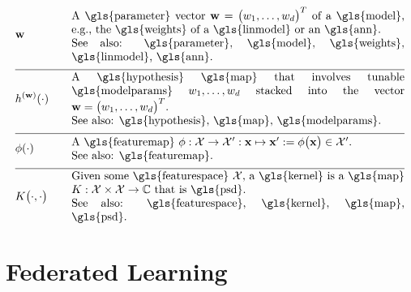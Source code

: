 \begin{align} 
	&\weights  &\quad & \parbox{.85\textwidth}{A \gls{parameter} vector $\weights = \big(\weight_{1}, \ldots, \weight_{\featuredim}\big)^{T}$ 
		of a \gls{model}, e.g., the \gls{weights} of a \gls{linmodel} or an \gls{ann}.
		\\ See also: \gls{parameter}, \gls{model}, \gls{weights}, \gls{linmodel}, \gls{ann}. }     \nonumber \\[2mm] \hline \nonumber\\[-5mm]
	&\hypothesis^{(\weights)}(\cdot)  &\quad &\parbox{.85\textwidth}{A \gls{hypothesis} \gls{map} that involves tunable \gls{modelparams} 
		$\weight_{1}, \ldots, \weight_{\featuredim}$ stacked into the vector $\weights=\big(\weight_{1}, \ldots, \weight_{\featuredim} \big)^{T}$.
		\\ See also: \gls{hypothesis}, \gls{map}, \gls{modelparams}. } \nonumber \\[2mm] \hline \nonumber\\[-5mm]
	&\featuremap(\cdot)  &\quad & \parbox{.85\textwidth}{A \gls{featuremap} 
		$\featuremap: \featurespace \rightarrow \featurespace' : \featurevec \mapsto \featurevec' \defeq \featuremap\big( \featurevec \big) \in \featurespace'$.
		\\ See also: \gls{featuremap}. }   \nonumber \\[2mm] \hline \nonumber\\[-5mm]
	&\kernelmap{\cdot}{\cdot} &\quad & \parbox{.85\textwidth}{Given some \gls{featurespace} $\featurespace$, 
		a \gls{kernel} is a \gls{map} $\kernel: \featurespace \times \featurespace \rightarrow \mathbb{C}$ that is \gls{psd}.
		\\ See also: \gls{featurespace}, \gls{kernel}, \gls{map}, \gls{psd}. }    \nonumber                                                                                                                                                     
\end{align}              






\newpage
\section*{Federated Learning}

